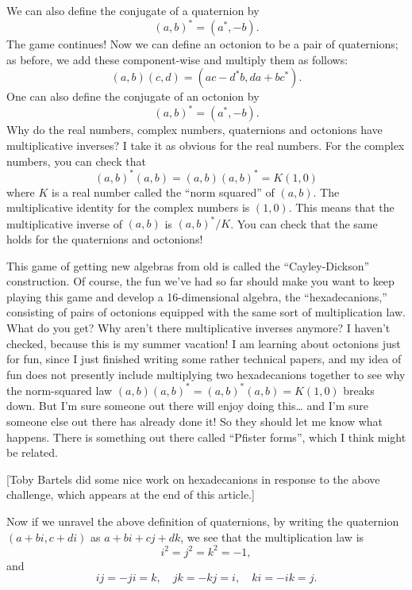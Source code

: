 \documentclass{article}
\begin{document}
We can also define the conjugate of a quaternion by
\[(a,b)^* = (a^*,-b).\] The game continues! Now we can define an
octonion to be a pair of quaternions; as before, we add these
component-wise and multiply them as follows:
\[(a,b)(c,d) = (ac - d^*b, da + bc^*).\] One can also define the
conjugate of an octonion by \[(a,b)^* = (a^*,-b).\] Why do the real
numbers, complex numbers, quaternions and octonions have multiplicative
inverses? I take it as obvious for the real numbers. For the complex
numbers, you can check that \[(a,b)^* (a,b) = (a,b) (a,b)^* = K (1,0)\]
where \(K\) is a real number called the ``norm squared'' of \((a,b)\).
The multiplicative identity for the complex numbers is \((1,0)\). This
means that the multiplicative inverse of \((a,b)\) is \((a,b)^*/K\). You
can check that the same holds for the quaternions and octonions!

This game of getting new algebras from old is called the
``Cayley-Dickson'' construction. Of course, the fun we've had so far
should make you want to keep playing this game and develop a
16-dimensional algebra, the ``hexadecanions,'' consisting of pairs of
octonions equipped with the same sort of multiplication law. What do you
get? Why aren't there multiplicative inverses anymore? I haven't
checked, because this is my summer vacation! I am learning about
octonions just for fun, since I just finished writing some rather
technical papers, and my idea of fun does not presently include
multiplying two hexadecanions together to see why the norm-squared law
\((a,b) (a,b)^* = (a,b)^* (a,b) = K (1,0)\) breaks down. But I'm sure
someone out there will enjoy doing this\ldots{} and I'm sure someone
else out there has already done it! So they should let me know what
happens. There is something out there called ``Pfister forms'', which I
think might be related.

{[}Toby Bartels did some nice work on hexadecanions in response to the
above challenge, which appears at the end of this article.{]}

Now if we unravel the above definition of quaternions, by writing the
quaternion \((a+bi,c+di)\) as \(a+bi+cj+dk\), we see that the
multiplication law is \[i^2 = j^2 = k^2 = -1,\] and
\[ij = -ji = k, \quad jk = -kj = i, \quad ki = -ik = j.\]
\end{document}
